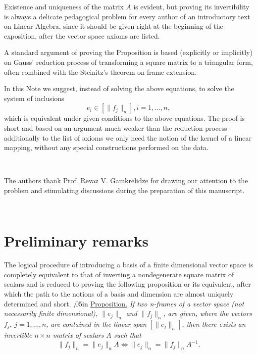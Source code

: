 \documentclass[]{amsart}
\begin{document}
\noindent
Existence and uniqueness of the matrix $A$ is evident, but proving its inverti\-bility is always a delicate pedagogical problem for every author of an introduc\-tory text on Linear Algebra, since it should be given right at the beginning of the exposition, after the vector space axioms are listed. 

\noindent
A standard argument of proving the Proposition is based
 (explicitly or implicitly)
  on Gauss' reduction process  of transforming a square matrix   to a 
triangular
  form, often combined with the Steinitz's theorem on   frame extension. 

\noindent
In this Note we suggest, instead of solving the above equations, to solve the system of inclusions
\[
e_i\in[\|f_j\|_n], i=1,\ldots, n,
\]
which is equivalent  under given conditions to  the above equations.    The proof is short and based on an argument much weaker 
than
the reduction process - additionally to the list of axioms we only need the notion of the kernel of a linear mapping, without any special constructions performed on the data.



\

\noindent
The authors thank Prof. Revaz V. Gamkrelidze for drawing our attention to the problem and stimulating discussions during the preparation of this manuscript.

\



     
 \section{Preliminary remarks}
 The logical procedure of introducing   a basis of a finite dimensional vector space
is completely equivalent to that of inverting a nondegenerate square matrix of scalars and is reduced to proving the following 
proposition
or its equivalent, after which the path to the notions of a basis and dimension 
are almost uniquely determined and short.
,05in
\noindent
\underline  {Proposition.} \emph{If two n-frames of a vector space (not necessarily finite dimensional), $\|e_j\|_n$ and $\|f_j\|_n$,  are given, where the vectors $f_j, \ j=1,\ldots, n$, are con\-tained in the linear span   
$[\|e_j \|_n]$, then there exists an invertible $n\times n$   matrix of scalars $A$ such that }
\begin{equation}
\label{1}
\|f_j\|_n=\|e_j\|_n A   \iff  \|e_j\|_n =\|f_j\|_nA^{-1}.    
 \end{equation}
\end{document}
